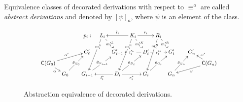 \documentclass[conference]{IEEEtran}
\newcommand{\bx}[1]{\phantom{\big(}#1{\phantom{\big)}}} %
\newcommand{\Rrel}[1]   {\stackrel{{#1}}{\Longrightarrow}}
\newcommand{\Abs}[1]{\ensuremath{\mathsf{Abs}({#1})}}
\newcommand{\can}[1]{\ensuremath{\mathsf{C}({#1})}}
\begin{document}
  Equivalence classes of decorated derivations 
  with respect to $\equiv^{a}$ 
  are called \emph{abstract derivations} and 
  denoted by
  $[\psi]_{a}$, where $\psi$ is an element of the class.

\begin{figure}
\vspace{-1.1cm}

\[
\scalebox{.8}{
\xymatrix@R=1.4mm@C=2mm{ 
  & & & {p_i:} & {L_i} \ar[ddddl]|/-6mm/{\bx{m_i^L}} \ar[ddr]|{\bx{m_i'^L}} & & {K_i}
  \ar[ll]_{l_i} \ar[rr]^{r_i} \ar[ddddl]|/-6mm/{\bx{m_i^K}} \ar[ddr]|{\bx{m_i'^K}} & &
  {R_i} \ar[ddddl]|/-6mm/{\bx{m_i^R}} \ar[ddr]|{\bx{m_i'^R}}& & & &\\
  & & & & & & & & & & &\\  
  & & & {G_0'} & & {G_{i-1}'} & &
  {D_i'} \ar[ll]|{\bx{l_i'^*}} \ar[rr]|{\bx{r_i'^*}} & & {G_{i}'} & & {G_n'} &\\
  {\can{G_0}} \ar[urrr]^{\alpha'} \ar[dr]_{\alpha}  & & & & & & & & & & & &
  {\can{G_n}} \ar[ul]_{\omega'} \ar[dlll]^{\omega} \\
  & {G_0} \ar[uurr]|{\theta_{G_0}} &  & {G_{i-1}} \ar[uurr]|{\theta_{G_{i-1}}} & &
  {D_i} \ar[ll]^{l_i^*} \ar[rr]_{r_i^*} \ar[uurr]|{\theta_{D_i}} & &
  G_{i} \ar[uurr]|{\theta_{G_{i}}} & & {G_n} \ar[uurr]|{\theta_{G_n}} & & }
}
\]

\caption{Abstraction equivalence of decorated derivations.}
\label{fi:der-iso}
\end{figure}


%  
\end{document}
